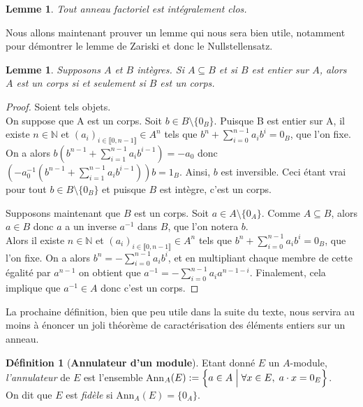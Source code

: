 \documentclass[10pt, twoside]{article}
\theoremstyle{plain}
\theoremstyle{definition}
\newtheorem{definition}[theorem]{Définition}
\theoremstyle{plain}
\theoremstyle{plain}
\newtheorem{lemma}[theorem]{Lemme}
\theoremstyle{definition}
\theoremstyle{remark}
\begin{document}
\begin{lemma}\label{lem:ann fact int clos}
    Tout anneau factoriel est intégralement clos.
\end{lemma}

Nous allons maintenant prouver un lemme qui nous sera bien utile, notamment pour démontrer le lemme de Zariski et donc le Nullstellensatz.

\begin{lemma}\label{lem:entier corps}
    Supposons $A$ et $B$ intègres. Si $A \subseteq B$ et si $B$ est entier sur $A$, alors $A$ est un corps si et seulement si $B$ est un corps.
\end{lemma}

\begin{proof}
    Soient tels objets.\\
    \fbox{$\Longrightarrow$} On suppose que A est un corps. Soit $b \in B \setminus \{0_B\}$. Puisque B est entier sur A, il existe $n \in \mathbb{N}$ et $(a_i)_{i \in \llbracket 0, n-1 \rrbracket} \in A^n$ tels que $b^n + \sum\limits_{i = 0}^{n-1} a_i b^i = 0_B$, que l'on fixe.\\
    On a alors $b(b^{n-1} + \sum\limits_{i = 1}^{n-1} a_i b^{i-1}) = - a_0 $ donc $(-a_{0}^{-1}(b^{n-1} + \sum\limits_{i = 1}^{n-1} a_i b^{i-1}))b = 1_B$. 
    Ainsi, $b$ est inversible. Ceci étant vrai pour tout $b \in B \setminus \{0_B\}$ et puisque $B$ est intègre, c'est un corps.

    \noindent\fbox{$\Longleftarrow$} Supposons maintenant que $B$ est un corps. Soit $a \in A\setminus \{0_A\}$. Comme $A \subseteq B$, alors $a \in B$ donc $a$ a un inverse $a^{-1}$ dans $B$, que l'on notera $b$.\\
    Alors il existe $n \in \mathbb{N}$ et $(a_i)_{i \in \llbracket 0, n-1 \rrbracket} \in A^n$ tels que $b^n + \sum\limits_{i = 0}^{n-1} a_i b^i = 0_B$, que l'on fixe. On a alors $b^n =- \sum\limits_{i = 0}^{n-1} a_i b^i$, et en multipliant chaque membre de cette égalité par $ a^{n-1}$ on obtient que $a^{-1} = - \sum\limits_{i = 0}^{n-1} a_i a^{n-1-i}$. Finalement, cela implique que $a^{-1} \in A$ donc c'est un corps. 
\end{proof}

La prochaine définition, bien que peu utile dans la suite du texte, nous servira au moins à énoncer un joli théorème de caractérisation des éléments entiers sur un anneau.

\begin{definition}[\textbf{Annulateur d'un module}]\label{def:annulateur}
    Etant donné $E$ un $A$-module, \textit{l'annulateur} de $E$ est l'ensemble Ann$_A(E) := \Bigl\{a \in A \; \Big| \; \forall x \in E, \; a \cdot x = 0_E \Bigr\}$.\\
    On dit que $E$ est \textit{fidèle} si Ann$_A(E) = \{0_A\}$.
\end{definition}
\end{document}
